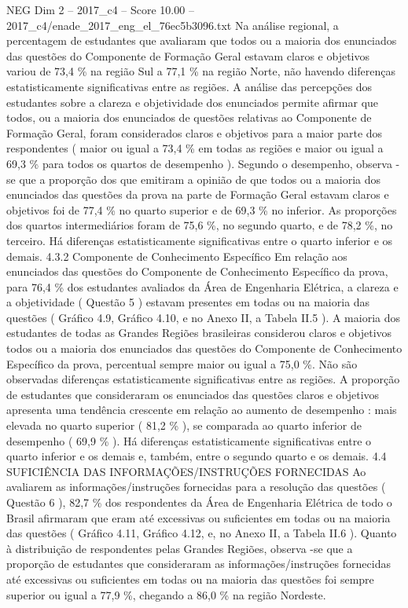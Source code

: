 \begin{textsample}{NEG Dim 2 – 2017\_c4 – Score 10.00 – 2017\_c4/enade\_2017\_eng\_el\_76ec5b3096.txt}
Na análise regional, a percentagem de estudantes que avaliaram que todos ou a maioria dos enunciados das questões do Componente de Formação Geral estavam claros e objetivos variou de 73,4 \% na região Sul a 77,1 \% na região Norte, não havendo diferenças estatisticamente significativas entre as regiões.
A análise das percepções dos estudantes sobre a clareza e objetividade dos enunciados permite afirmar que todos, ou a maioria dos enunciados de questões relativas ao Componente de Formação Geral, foram considerados claros e objetivos para a maior parte dos respondentes ( maior ou igual a 73,4 \% em todas as regiões e maior ou igual a 69,3 \% para todos os quartos de desempenho ).
Segundo o desempenho, observa -se que a proporção dos que emitiram a opinião de que todos ou a maioria dos enunciados das questões da prova na parte de Formação Geral estavam claros e objetivos foi de 77,4 \% no quarto superior e de 69,3 \% no inferior.
As proporções dos quartos intermediários foram de 75,6 \%, no segundo quarto, e de 78,2 \%, no terceiro.
Há diferenças estatisticamente significativas entre o quarto inferior e os demais. 4.3.2 Componente de Conhecimento Específico Em relação aos enunciados das questões do Componente de Conhecimento Específico da prova, para 76,4 \% dos estudantes avaliados da Área de Engenharia Elétrica, a clareza e a objetividade ( Questão 5 ) estavam presentes em todas ou na maioria das questões ( Gráfico 4.9, Gráfico 4.10, e no Anexo II, a Tabela II.5 ).
A maioria dos estudantes de todas as Grandes Regiões brasileiras considerou claros e objetivos todos ou a maioria dos enunciados das questões do Componente de Conhecimento Específico da prova, percentual sempre maior ou igual a 75,0 \%.
Não são observadas diferenças estatisticamente significativas entre as regiões.
A proporção de estudantes que consideraram os enunciados das questões claros e objetivos apresenta uma tendência crescente em relação ao aumento de desempenho : mais elevada no quarto superior ( 81,2 \% ), se comparada ao quarto inferior de desempenho ( 69,9 \% ).
Há diferenças estatisticamente significativas entre o quarto inferior e os demais e, também, entre o segundo quarto e os demais. 4.4 SUFICIÊNCIA DAS INFORMAÇÕES/INSTRUÇÕES FORNECIDAS Ao avaliarem as informações/instruções fornecidas para a resolução das questões ( Questão 6 ), 82,7 \% dos respondentes da Área de Engenharia Elétrica de todo o Brasil afirmaram que eram até excessivas ou suficientes em todas ou na maioria das questões ( Gráfico 4.11, Gráfico 4.12, e, no Anexo II, a Tabela II.6 ).
Quanto à distribuição de respondentes pelas Grandes Regiões, observa -se que a proporção de estudantes que consideraram as informações/instruções fornecidas até excessivas ou suficientes em todas ou na maioria das questões foi sempre superior ou igual a 77,9 \%, chegando a 86,0 \% na região Nordeste.

\end{textsample}
